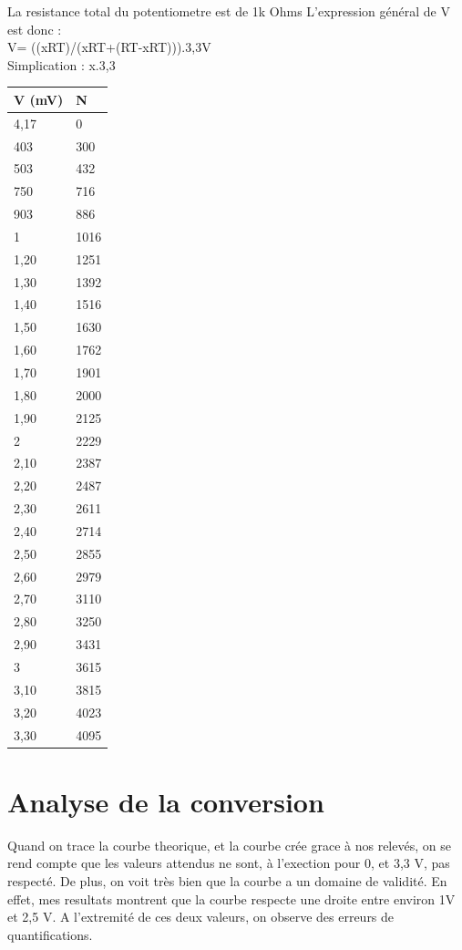 \documentclass[10pt,a4paper]{article}
\begin{document}
 La resistance total du potentiometre est de 1k Ohms
 L'expression général de V est donc :\\
 
 V= ((xRT)/(xRT+(RT-xRT))).3,3V\\
 Simplication : x.3,3\\
 
 
 \begin{tabular}{|l|l|}
\hline
    V (mV) & N \\ \hline
    4,17 & 0   \\ \hline
    403 &  300 \\ \hline
    503 & 432 \\ \hline
    750 & 716 \\ \hline
    903 & 886 \\ \hline
    1 & 1016 \\ \hline
    1,20 & 1251\\ \hline
    1,30 & 1392 \\ \hline
    1,40 & 1516 \\ \hline
    1,50 & 1630 \\ \hline
    1,60 & 1762\\ \hline
    1,70&1901\\ \hline
    1,80&2000\\ \hline
    1,90& 2125\\ \hline
    2&2229\\ \hline
    2,10&2387\\ \hline
    2,20&2487\\ \hline
    2,30&2611\\ \hline
    2,40& 2714\\ \hline
    2,50& 2855\\ \hline
    2,60& 2979 \\ \hline
    2,70&3110\\ \hline
    2,80& 3250 \\ \hline
    2,90& 3431 \\ \hline
    3& 3615 \\ \hline
    3,10& 3815 \\ \hline
    3,20&4023\\ \hline
    3,30& 4095 \\ \hline

\hline
\end{tabular}

 \section{Analyse de la conversion}
Quand on trace la courbe theorique, et la courbe crée grace à nos relevés, on se rend compte que les valeurs attendus ne sont, à l'exection pour 0, et 3,3 V, pas respecté. De plus, on voit très bien que la courbe a un domaine de validité. En effet, mes resultats montrent que la courbe respecte une droite entre environ 1V et 2,5 V. A l'extremité de ces deux valeurs, on observe des erreurs de quantifications.  
\end{document}
